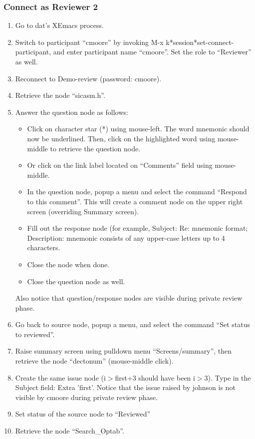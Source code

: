 \subsubsection {Connect as Reviewer 2}
\begin{enumerate}
\item Go to dat's XEmacs process.
\item Switch to participant ``cmoore'' by invoking M-x
k*session*set-connect-participant, and enter participant name ``cmoore''.
Set the role to ``Reviewer'' as well.
\item Reconnect to Demo-review (password: cmoore).
\item Retrieve the node ``sicasm.h''.
\item Answer the question node as follows:
   \begin{itemize}
   \item Click on character star (*) using mouse-left. The word
   mnemonic should now be underlined. Then, click  on the highlighted
   word using mouse-middle to retrieve the question node. 
   \item Or click on the link label located on ``Comments'' field
   using mouse-middle. 
   \item In the question node, popup a menu and select the command
   ``Respond to this comment''. This will create a comment node on the
   upper right screen (overriding Summary screen).
   \item Fill out the response node (for example, Subject: Re:
   mnemonic format; Description:  mnemonic consists of any upper-case
   letters up to 4 characters.
   \item Close the node when done.
   \item Close the question node as well.
   \end{itemize}
   Also notice that question/response nodes are visible during private
   review phase. 
\item Go back to source node, popup a menu, and select the command 
``Set status to reviewed''.
\item Raise summary screen using pulldown menu ``Screens/summary'', then
retrieve the node ``dectonum'' (mouse-middle click).
\item Create the same issue node (i$>$first+3 should have been i$>$3).
Type in the Subject field: Extra 'first'.
Notice that the issue raised by johnson is not visible by cmoore
during private review phase.
\item Set status of the source node to ``Reviewed''
\item Retrieve the node ``Search\_Optab''.

\end{enumerate}

